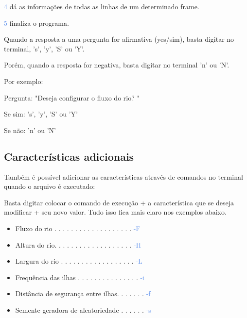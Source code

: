 \documentclass[a4paper,12pt]{article}
\begin{document}
  \textcolor{CornflowerBlue}{4} dá as informações de todas as linhas de um 
  determinado frame.
  
  \textcolor{CornflowerBlue}{5} finaliza o programa.
  
  
  Quando a resposta a uma pergunta for afirmativa (yes/sim), basta digitar no 
  terminal, 's', 'y', 'S' ou 'Y'.
  
  Porém, quando a resposta for negativa, basta digitar no terminal 'n' ou 'N'.
  \bigskip
  
  Por exemplo:
  
  Pergunta: "\textcolor{NavyBlue}{Deseja configurar o fluxo do rio? }"
  
  Se sim:   '\textcolor{NavyBlue}{s}', '\textcolor{NavyBlue}{y}',
  '\textcolor{NavyBlue}{S}' ou '\textcolor{NavyBlue}{Y}'
  
  Se não:   '\textcolor{NavyBlue}{n}' ou '\textcolor{NavyBlue}{N}'


\newpage %


  \bigskip
  \subsection{\textcolor{NavyBlue}{Características adicionais}}
  
  Também é possível adicionar as características através de comandos no terminal 
  quando o arquivo é executado:
  
  Basta digitar colocar o comando de execução + a característica que se deseja 
  modificar + seu novo valor. Tudo isso fica mais claro nos exemplos abaixo.
  
  \bigskip
  \begin{itemize}
  
  \item Fluxo do rio . . . . . . . . . . . . . . . . . . .  \textcolor{CornflowerBlue}{-F}
  \item Altura do rio. . . . . . . . . . . . . . . . . . .  \textcolor{CornflowerBlue}{-H}
  \item Largura do rio . . . . . . . . . . . . . . . . . .  \textcolor{CornflowerBlue}{-L}
  \item Frequência das ilhas . . . . . . . . . . . . . . .  \textcolor{CornflowerBlue}{-i} 
  \item Distância de segurança entre ilhas. . . . . . .  \textcolor{CornflowerBlue}{-f}
  \item Semente geradora de aleatoriedade . . . . . .  \textcolor{CornflowerBlue}{-s}
  
  \end{itemize}
  \bigskip
  
\end{document}
